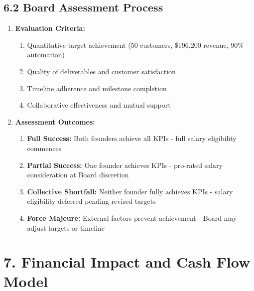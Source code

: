 \subsection*{6.2 Board Assessment Process}
\begin{enumerate}[label=\arabic*.]
\item \textbf{Evaluation Criteria:}
    \begin{enumerate}[label=(\alph*)]
    \item Quantitative target achievement (50 customers, \$196,200 revenue, 90\% automation)
    \item Quality of deliverables and customer satisfaction
    \item Timeline adherence and milestone completion
    \item Collaborative effectiveness and mutual support
    \end{enumerate}

\item \textbf{Assessment Outcomes:}
    \begin{enumerate}[label=(\alph*)]
    \item \textbf{Full Success:} Both founders achieve all KPIs - full salary eligibility commences
    \item \textbf{Partial Success:} One founder achieves KPIs - pro-rated salary consideration at Board discretion
    \item \textbf{Collective Shortfall:} Neither founder fully achieves KPIs - salary eligibility deferred pending revised targets
    \item \textbf{Force Majeure:} External factors prevent achievement - Board may adjust targets or timeline
    \end{enumerate}
\end{enumerate}

\section*{7. Financial Impact and Cash Flow Model}

